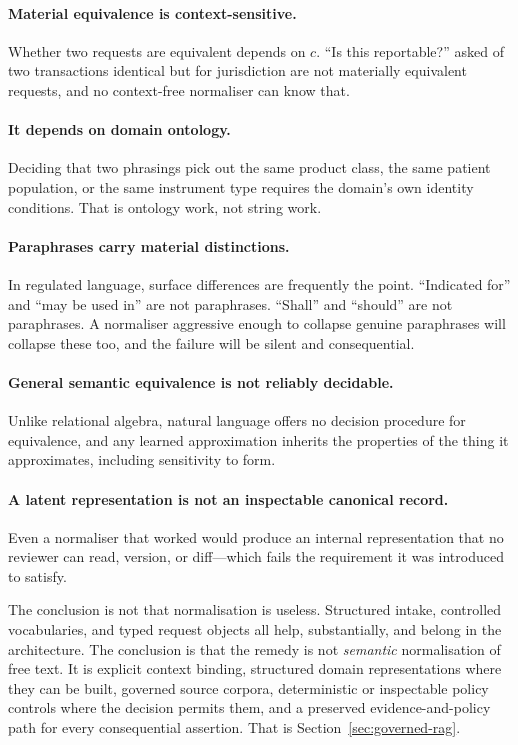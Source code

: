 \documentclass[11pt]{article}
\theoremstyle{plain}
\theoremstyle{definition}
\begin{document}
\paragraph{Material equivalence is context-sensitive.} Whether two requests are
equivalent depends on $c$. ``Is this reportable?'' asked of two transactions
identical but for jurisdiction are not materially equivalent requests, and no
context-free normaliser can know that.

\paragraph{It depends on domain ontology.} Deciding that two phrasings pick out the
same product class, the same patient population, or the same instrument type
requires the domain's own identity conditions. That is ontology work, not string
work.

\paragraph{Paraphrases carry material distinctions.} In regulated language, surface
differences are frequently the point. ``Indicated for'' and ``may be used in'' are
not paraphrases. ``Shall'' and ``should'' are not paraphrases. A normaliser
aggressive enough to collapse genuine paraphrases will collapse these too, and the
failure will be silent and consequential.

\paragraph{General semantic equivalence is not reliably decidable.} Unlike
relational algebra, natural language offers no decision procedure for equivalence,
and any learned approximation inherits the properties of the thing it approximates,
including sensitivity to form.

\paragraph{A latent representation is not an inspectable canonical record.} Even a
normaliser that worked would produce an internal representation that no reviewer
can read, version, or diff---which fails the requirement it was introduced to
satisfy.

The conclusion is not that normalisation is useless. Structured intake, controlled
vocabularies, and typed request objects all help, substantially, and belong in the
architecture. The conclusion is that the remedy is not \emph{semantic}
normalisation of free text. It is explicit context binding, structured domain
representations where they can be built, governed source corpora, deterministic or
inspectable policy controls where the decision permits them, and a preserved
evidence-and-policy path for every consequential assertion. That is
Section~\ref{sec:governed-rag}.
\end{document}
